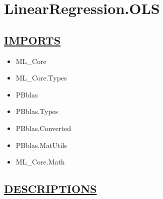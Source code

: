 \chapter*{LinearRegression.OLS}
\hypertarget{LinearRegression.OLS}{}

\section*{\underline{IMPORTS}}
\begin{itemize}
\item ML\_Core
\item ML\_Core.Types
\item PBblas
\item PBblas.Types
\item PBblas.Converted
\item PBblas.MatUtils
\item ML\_Core.Math
\end{itemize}

\section*{\underline{DESCRIPTIONS}}
